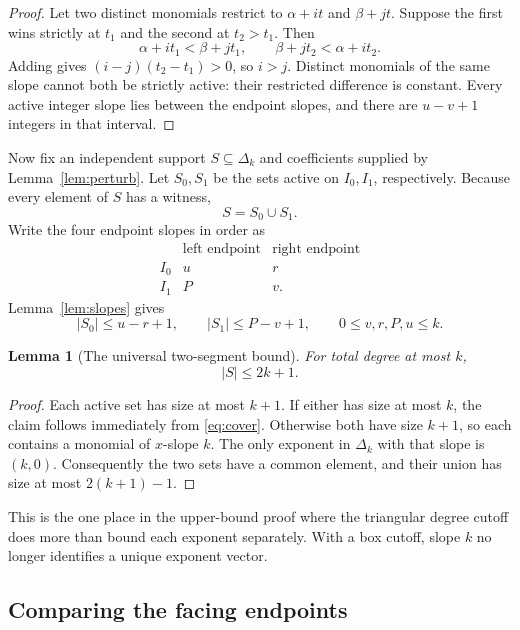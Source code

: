 \documentclass[11pt,a4paper]{article}
\numberwithin{equation}{section}
\newtheorem{lemma}[theorem]{Lemma}
\theoremstyle{definition}
\theoremstyle{remark}
\begin{document}
\begin{proof}
Let two distinct monomials restrict to $\alpha+it$ and $\beta+jt$.
Suppose the first wins strictly at $t_1$ and the second at $t_2>t_1$. Then
\[
\alpha+it_1<\beta+jt_1,
\qquad
\beta+jt_2<\alpha+it_2.
\]
Adding gives $(i-j)(t_2-t_1)>0$, so $i>j$. Distinct monomials of the same
slope cannot both be strictly active: their restricted difference is
constant. Every active integer slope lies between the endpoint slopes, and
there are $u-v+1$ integers in that interval.
\end{proof}

Now fix an independent support $S\subseteq\Delta_k$ and coefficients supplied
by Lemma~\ref{lem:perturb}. Let $S_0,S_1$ be the sets active on $I_0,I_1$,
respectively. Because every element of $S$ has a witness,
\begin{equation}
\label{eq:cover}
S=S_0\cup S_1.
\end{equation}
Write the four endpoint slopes in order as
\[
\begin{array}{c|cc}
&\text{left endpoint}&\text{right endpoint}\\ \hline
I_0&u&r\\
I_1&P&v.
\end{array}
\]
Lemma~\ref{lem:slopes} gives
\begin{equation}
\label{eq:counts}
|S_0|\leq u-r+1,\qquad |S_1|\leq P-v+1,
\qquad 0\leq v,r,P,u\leq k.
\end{equation}

\begin{lemma}[The universal two-segment bound]
\label{lem:2k}
For total degree at most $k$,
\[
|S|\leq2k+1.
\]
\end{lemma}

\begin{proof}
Each active set has size at most $k+1$. If either has size at most $k$, the
claim follows immediately from \eqref{eq:cover}. Otherwise both have size
$k+1$, so each contains a monomial of $x$-slope $k$. The only exponent in
$\Delta_k$ with that slope is $(k,0)$. Consequently the two sets have a common
element, and their union has size at most $2(k+1)-1$.
\end{proof}

This is the one place in the upper-bound proof where the triangular degree
cutoff does more than bound each exponent separately. With a box cutoff,
slope $k$ no longer identifies a unique exponent vector.

\subsection{Comparing the facing endpoints}
\end{document}

